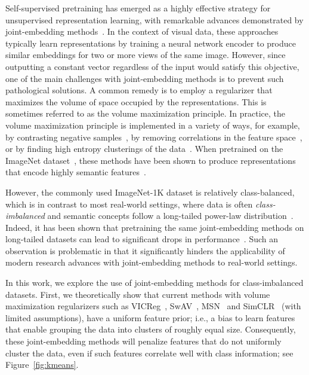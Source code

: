 \documentclass{article} %
\begin{document}
Self-supervised pretraining has emerged as a highly effective strategy for unsupervised representation learning, with remarkable advances demonstrated by joint-embedding methods~\citep{chen2020simple,caron2021emerging,bardes2021vicreg,assran2022masked}.
In the context of visual data, these approaches typically learn representations by training a neural network encoder to produce similar embeddings for two or more views of the same image.
However, since outputting a constant vector regardless of the input would satisfy this objective, one of the main challenges with joint-embedding methods is to prevent such pathological solutions.
A common remedy is to employ a regularizer that maximizes the volume of space occupied by the representations.
This is sometimes referred to as the volume maximization principle.
In practice, the volume maximization principle is implemented in a variety of ways, for example, by contrasting negative samples~\citep{bromley1993signature,he2019moco,chen2020simple}, by removing correlations in the feature space~\citep{bardes2021vicreg, zbontar2021barlow}, or by finding high entropy clusterings of the data~\citep{asano2019self, caron2020unsupervised, assran2021semi, assran2022masked}.
When pretrained on the ImageNet dataset~\citep{russakovsky2015imagenet}, these methods have been shown to produce representations that encode highly semantic features~\citep{caron2020unsupervised, caron2021emerging, assran2022masked}.


However, the commonly used ImageNet-1K dataset is relatively class-balanced, which is in contrast to most real-world settings, where data is often \emph{class-imbalanced} and semantic concepts follow a long-tailed power-law distribution~\citep{newman2005power, mahajan2018exploring, van2018inaturalist}.
Indeed, it has been shown that pretraining the same joint-embedding methods on long-tailed datasets can lead to significant drops in performance~\citep{tian2021divide}.
Such an observation is problematic in that it significantly hinders the applicability of modern research advances with joint-embedding methods to real-world settings.

In this work, we explore the use of joint-embedding methods for class-imbalanced datasets.
First, we theoretically show that current methods with volume maximization regularizers such as VICReg~\citep{bardes2021vicreg}, SwAV~\citep{caron2020unsupervised}, %
MSN~\citep{assran2022masked} and SimCLR~\citep{chen2020simple} (with limited assumptions),  have a uniform feature prior; i.e., a bias to learn features that enable grouping the data into clusters of roughly equal size.
Consequently, these joint-embedding methods will penalize features that do not uniformly cluster the data, even if such features correlate well with class information; see Figure~\ref{fig:kmeans}.
\end{document}
